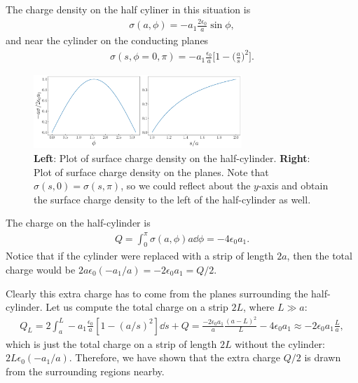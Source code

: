{The charge density on the half cyliner in this situation is
\begin{eqnarray}
    \sigma(a,\phi) = -a_1 \frac{2 \epsilon_0}{a} \sin{\phi}
,\end{eqnarray}
and near the cylinder on the conducting planes
\begin{eqnarray}
    \sigma(s,\phi=0,\pi) = -a_1 \frac{\epsilon_0}{a} \Big[ 1 - \Big( \frac{a}{s} \Big)^2 \Big]
.\end{eqnarray}

\begin{figure}[h!]
   \centering
   \includegraphics[width=0.7\textwidth]{prob4c.pdf}
   \caption{\textbf{Left}: Plot of surface charge density on the half-cylinder. \textbf{Right}: Plot of surface charge density on the planes. Note that $\sigma(s,0) = \sigma(s,\pi)$, so we could reflect about the $y$-axis and obtain the surface charge density to the left of the half-cylinder as well.}
   \label{}
\end{figure}

The charge on the half-cylinder is
\begin{eqnarray}
    Q = \int_{0}^{\pi} \sigma(a,\phi) a \dd{\phi} = -4 \epsilon_0 a_1
.\end{eqnarray}
Notice that if the cylinder were replaced with a strip of length $2a$, then the total charge would be $2a\epsilon_0(-a_1/a) = -2 \epsilon_0 a_1 = Q/2$.

Clearly this extra charge has to come from the planes surrounding the half-cylinder.
Let us compute the total charge on a strip $2L$, where $L \gg a$:
\begin{eqnarray}
    Q_{L} = 2\int_{a}^{L} -a_1 \frac{\epsilon_0}{a} [1 - (a/s)^2] \dd{s} + Q = \frac{-2\epsilon_0 a_1}{a}\frac{(a - L)^2}{L} - 4 \epsilon_0 a_1 \approx -2 \epsilon_0 a_1 \frac{L}{a}
,\end{eqnarray}
which is just the total charge on a strip of length $2L$ without the cylinder: $2L\epsilon_0 (-a_1/a)$.
Therefore, we have shown that the extra charge $Q/2$ is drawn from the surrounding regions nearby.

}





